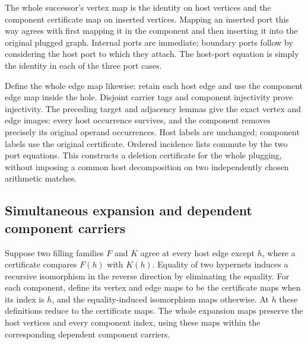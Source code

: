 




The whole successor's vertex map is the identity on host vertices and the
component certificate map on inserted vertices. Mapping an inserted port this
way agrees with first mapping it in the component and then inserting it into
the original plugged graph. Internal ports are immediate; boundary ports
follow by considering the host port to which they attach. The host-port equation
is simply the identity in each of the three port cases.



Define the whole edge map likewise: retain each host edge and use the
component edge map inside the hole. Disjoint carrier tags and component
injectivity prove injectivity. The preceding target and adjacency lemmas give
the exact vertex and edge images: every host occurrence survives, and the
component removes precisely its original operand occurrences. Host labels are
unchanged; component labels use the original certificate. Ordered incidence
lists commute by the two port equations. This constructs a deletion certificate
for the whole plugging, without imposing a common host decomposition on two
independently chosen arithmetic matches.


\subsection{Simultaneous expansion and dependent component carriers}

Suppose two filling families $F$ and $K$ agree at every host edge except
$h$, where a certificate compares $F(h)$ with $K(h)$. Equality of two hypernets
induces a recursive isomorphism in the reverse direction by eliminating the
equality. For each component, define its vertex and edge maps to be the
certificate maps when its index is $h$, and the equality-induced isomorphism
maps otherwise. At $h$ these definitions reduce to the certificate maps.
The whole expansion maps preserve the host vertices and every component index,
using these maps within the corresponding dependent component carriers.

